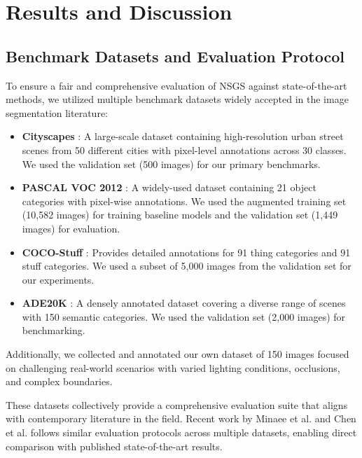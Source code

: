 \documentclass[conference]{IEEEtran}
\begin{document}
\section{Results and Discussion} \label{sec:results}

\subsection{Benchmark Datasets and Evaluation Protocol}
To ensure a fair and comprehensive evaluation of NSGS against state-of-the-art methods, we utilized multiple benchmark datasets widely accepted in the image segmentation literature:

\begin{itemize}
    \item \textbf{Cityscapes} \cite{Cordts2016}: A large-scale dataset containing high-resolution urban street scenes from 50 different cities with pixel-level annotations across 30 classes. We used the validation set (500 images) for our primary benchmarks.
    
    \item \textbf{PASCAL VOC 2012} \cite{Everingham2015}: A widely-used dataset containing 21 object categories with pixel-wise annotations. We used the augmented training set (10,582 images) for training baseline models and the validation set (1,449 images) for evaluation.
    
    \item \textbf{COCO-Stuff} \cite{Caesar2018}: Provides detailed annotations for 91 thing categories and 91 stuff categories. We used a subset of 5,000 images from the validation set for our experiments.
    
    \item \textbf{ADE20K} \cite{Zhou2019}: A densely annotated dataset covering a diverse range of scenes with 150 semantic categories. We used the validation set (2,000 images) for benchmarking.
\end{itemize}

Additionally, we collected and annotated our own dataset of 150 images focused on challenging real-world scenarios with varied lighting conditions, occlusions, and complex boundaries.

These datasets collectively provide a comprehensive evaluation suite that aligns with contemporary literature in the field. Recent work by Minaee et al. \cite{Minaee2021} and Chen et al. \cite{Chen2021} follows similar evaluation protocols across multiple datasets, enabling direct comparison with published state-of-the-art results.
\end{document}
